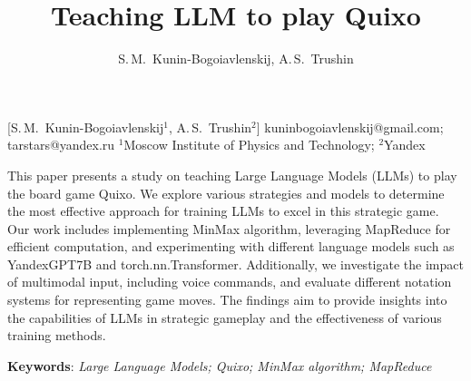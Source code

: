 \documentclass[12pt, twoside]{article}
\begin{document}
\English

\title
	[Thesis] %
    {Teaching LLM to play Quixo} %
\author
	[S.\,M.~Kunin-Bogoiavlenskij] %
	{S.\,M.~Kunin-Bogoiavlenskij, A.\,S.~Trushin} %
    [S.\,M.~Kunin-Bogoiavlenskij$^1$, A.\,S.~Trushin$^2$] %
\email
    {kuninbogoiavlenskij@gmail.com; tarstars@yandex.ru}
\organization
    {$^1$Moscow Institute of Physics and Technology;
     $^2$Yandex}
\abstract
    {	
	This paper presents a study on teaching Large Language Models (LLMs) to play the board game Quixo. 
	We explore various strategies and models to determine the most effective approach for training LLMs to excel in this strategic game. 
	Our work includes implementing MinMax algorithm, leveraging MapReduce for efficient computation, and experimenting with different language models such as YandexGPT7B and torch.nn.Transformer. 
	Additionally, we investigate the impact of multimodal input, including voice commands, and evaluate different notation systems for representing game moves. 
	The findings aim to provide insights into the capabilities of LLMs in strategic gameplay and the effectiveness of various training methods.

    	\textbf{Keywords}: \emph{Large Language Models; Quixo; MinMax algorithm; MapReduce}}
\end{document}
